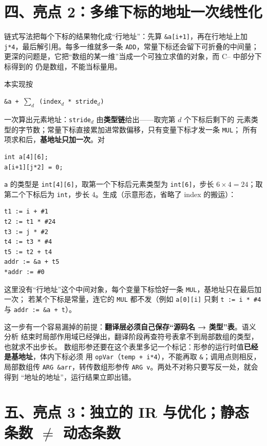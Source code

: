 \documentclass[11pt,a4paper]{ctexart}
\newcommand{\code}[1]{\texttt{#1}}
\begin{document}
\section*{四、亮点 2：多维下标的地址一次线性化}

链式写法把每个下标的结果物化成“行地址”：先算 \code{\&a[i+1]}，再在行地址上加
\code{j*4}，最后解引用。每多一维就多一条 \code{ADD}，常量下标还会留下可折叠的中间量；
更深的问题是，它把“数组的某一维”当成一个可独立求值的对象，而 C-- 中部分下标得到的
仍是数组，不能当标量用。

本实现按
\begin{center}
\code{\&a + $\sum_d$ (index$_d$ * stride$_d$)}
\end{center}
一次算出元素地址：\code{stride$_d$} 由\textbf{类型链}给出——取完第 $d$ 个下标后剩下的
元素类型的字节数；常量下标直接累加进常数偏移，只有变量下标才发一条 \code{MUL}；
所有项求和后，\textbf{基地址只加一次}。对

\begin{lstlisting}
int a[4][6];
a[i+1][j*2] = 0;
\end{lstlisting}

\code{a} 的类型是 \code{int[4][6]}，取第一个下标后元素类型为 \code{int[6]}，步长
$6\times4=24$；取第二个下标后为 \code{int}，步长 4。生成（示意形态，省略了
index 的搬运）：

\begin{lstlisting}
t1 := i + #1
t2 := t1 * #24
t3 := j * #2
t4 := t3 * #4
t5 := t2 + t4
addr := &a + t5
*addr := #0
\end{lstlisting}

这里没有“行地址”这个中间对象，每个变量下标恰好一条 \code{MUL}，基地址只在最后加一次；
若某个下标是常量，连它的 \code{MUL} 都不发（例如 \code{a[0][i]} 只剩
\code{t := i * \#4} 与 \code{addr := \&a + t}）。

这一步有一个容易漏掉的前提：\textbf{翻译层必须自己保存“源码名 → 类型”表}。语义分析
结束时局部作用域已经弹出，翻译阶段再查符号表拿不到局部数组的类型，也就求不出步长。
数组形参还要在这个表里多记一个标记：形参的运行时值\textbf{已经是基地址}，体内下标必须
用 \code{opVar}（\code{temp + i*4}），不能再取 \code{\&}；调用点则相反，局部数组传
\code{ARG \&arr}，转传数组形参传 \code{ARG v}。两处不对称只要写反一处，就会得到
“地址的地址”，运行结果立即出错。

\section*{五、亮点 3：独立的 IR 与优化；静态条数 $\neq$ 动态条数}
\end{document}
